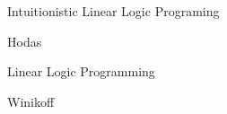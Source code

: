 \begin{pgroup}{Intuitionistic Linear Logic Programing}
  \begin{paper}{Hodas}
    \mustread
  \end{paper}
\end{pgroup}

\begin{pgroup}{Linear Logic Programming}
  \begin{paper}{Winikoff}
    \mustread
  \end{paper}
\end{pgroup}
